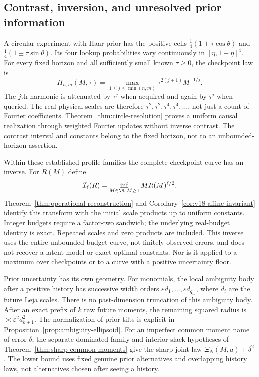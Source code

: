 \subsection{Contrast, inversion, and unresolved prior information}
A circular experiment with Haar prior has the positive cells
$\tfrac14(1\pm\tau\cos\theta)$ and
$\tfrac14(1\pm\tau\sin\theta)$. Its four lookup probabilities vary
continuously in $[\eta,1-\eta]^4$. For every fixed horizon and all
sufficiently small known $\tau\ge0$, the checkpoint law is
\[
 H_{n,m}(M,\tau)=
   \max_{1\le j\le\min(n,m)}\tau^{2(j+1)}M^{-1/j}.
\]
The $j$th harmonic is attenuated by $\tau^j$ when acquired and again
by $\tau^j$ when queried. The real physical scales are therefore
$\tau^2,\tau^2,\tau^4,\tau^4,\ldots$, not just a count of Fourier
coefficients. Theorem~\ref{thm:circle-resolution} proves a uniform
causal realization through weighted Fourier updates without inverse
contrast. The contrast interval and constants belong to the fixed
horizon, not to an unbounded-horizon assertion.

Within these established profile families the complete checkpoint curve
has an inverse. For $R(M)$ define
\[
 \mathcal I_\ell(R)=\inf_{M\in\N,\,M\ge1}M R(M)^{\ell/2}.
\]
Theorem~\ref{thm:operational-reconstruction} and
Corollary~\ref{cor:v18-affine-invariant} identify this transform with
the initial scale products up to uniform constants. Integer budgets
require a factor-two sandwich; the underlying real-budget identity is
exact. Repeated scales and zero products are included. This inverse
uses the entire unbounded budget curve, not finitely observed errors,
and does not recover a latent model or exact optimal constants. Nor is
it applied to a maximum over checkpoints or to a curve with a positive
uncertainty floor.

Prior uncertainty has its own geometry. For monomials, the local
ambiguity body after a positive history has successive width orders
$\varepsilon d_1,\ldots,\varepsilon d_{q_m}$, where $d_i$ are the
future Leja scales. There is no past-dimension truncation of this
ambiguity body. After an exact prefix of $k$ raw future moments,
the remaining squared radius is $\asymp\varepsilon^2d_{k+1}^2$.
The normalization of prior tilts is explicit in
Proposition~\ref{prop:ambiguity-ellipsoid}. For an imperfect common
moment name of error $\delta$, the separate dominated-family and
interior-slack hypotheses of Theorem~\ref{thm:sharp-common-moments}
give the sharp joint law $\Xi_N(M,a)+\delta^2$. The lower bound
uses fixed genuine prior alternatives and overlapping history laws,
not alternatives chosen after seeing a history.

